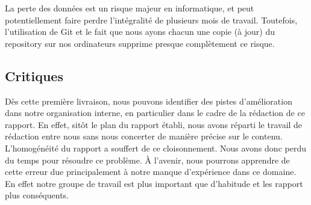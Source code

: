 	    La perte des données est un risque majeur en informatique, et peut potentiellement faire perdre l'intégralité de plusieurs mois de travail. Toutefois, l'utilisation de Git et le fait que nous ayons chacun une copie (à jour) du repository sur nos ordinateurs supprime presque complètement ce risque.

	\subsection{Critiques}

		Dès cette première livraison, nous pouvons identifier des pistes d'amélioration dans notre organisation interne, en particulier dans le cadre de la rédaction de ce rapport. En effet, sitôt le plan du rapport établi, nous avons réparti le travail de rédaction entre nous sans nous concerter de manière précise sur le contenu. L'homogénéité du rapport a souffert de ce cloisonnement. Nous avons donc perdu du temps pour résoudre ce problème. \`A l'avenir, nous pourrons apprendre de cette erreur due principalement à notre manque d'expérience dans ce domaine. En effet notre groupe de travail est plus important que d'habitude et les rapport plus conséquents.